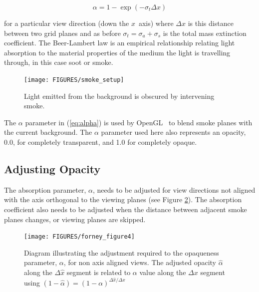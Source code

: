 {\begin{equation}
\label{eq:alpha}
\alpha=1-\exp(-\sigma_t\Delta x)
\end{equation}

\noindent for a particular view direction (down the $x$~axis)
where $\Delta x$ is this distance between two grid planes and as
before $\sigma_t=\sigma_a+\sigma_s$ is the total mass extinction
coefficient.  The Beer-Lambert law is an empirical relationship
relating light absorption to the material properties of the medium
the light is travelling through, in this case soot or smoke.

\begin{figure}[\figoptions]
\begin{center}
\texttt{[image: FIGURES/smoke\_setup]}
\end{center}
\caption[Light emitted from the background is obscured by intervening smoke.]
{Light emitted from the background is obscured by intervening smoke.
}
\label{figsmokesetup}
\end{figure}

The $\alpha$ parameter in (\ref{eq:alpha}) is used by OpenGL~\cite{OpenGLRed} to blend smoke planes with the current background.  The $\alpha$ parameter used here also represents an opacity, 0.0, for completely transparent, and 1.0 for completely opaque.


\subsection{Adjusting Opacity}

The absorption parameter, $\alpha$, needs to be adjusted for view directions not aligned with the axis orthogonal to the viewing planes (see Figure \ref{figray}).  The absorption coefficient also needs to be adjusted when the distance between adjacent smoke planes changes, or viewing planes are skipped.

\begin{figure}[\figoptions]
\centerline{\texttt{[image: FIGURES/forney\_figure4]}}
\caption [Diagram illustrating the adjustment required to the opaqueness parameter, $\alpha$,
for non-axis aligned views.]
{ Diagram illustrating the adjustment required to the opaqueness parameter, $\alpha$,
for non axis aligned views.
The adjusted opacity $\hat{\alpha}$ along the $\Delta\hat{x}$ segment is related to $\alpha$ value along the $\Delta x$ segment using $(1-\hat{\alpha})=(1-\alpha)^{\Delta \hat{x}/\Delta x}$}
\label{figray}
\end{figure}

}
